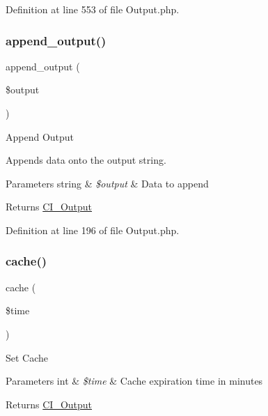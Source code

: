 Definition at line 553 of file Output.\+php.

\mbox{\label{class_c_i___output_a7c79b8239d6ecbba0c8fdd00bb619651}} 
\subsubsection{\texorpdfstring{append\_output()}{append\_output()}}
{\footnotesize\ttfamily append\+\_\+output (\begin{DoxyParamCaption}\item[{}]{\$output }\end{DoxyParamCaption})}

Append Output

Appends data onto the output string.


\begin{DoxyParams}[1]{Parameters}
string & {\em \$output} & Data to append \\
\hline
\end{DoxyParams}
\begin{DoxyReturn}{Returns}
\mbox{\hyperlink{class_c_i___output}{C\+I\+\_\+\+Output}} 
\end{DoxyReturn}


Definition at line 196 of file Output.\+php.

\mbox{\label{class_c_i___output_a6eae3cd828cf30926d44f1ab6011f939}} 
\subsubsection{\texorpdfstring{cache()}{cache()}}
{\footnotesize\ttfamily cache (\begin{DoxyParamCaption}\item[{}]{\$time }\end{DoxyParamCaption})}

Set Cache


\begin{DoxyParams}[1]{Parameters}
int & {\em \$time} & Cache expiration time in minutes \\
\hline
\end{DoxyParams}
\begin{DoxyReturn}{Returns}
\mbox{\hyperlink{class_c_i___output}{C\+I\+\_\+\+Output}} 
\end{DoxyReturn}


